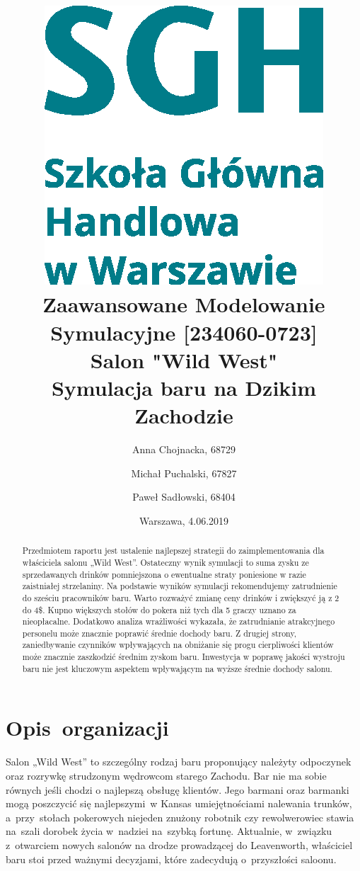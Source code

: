 \documentclass[12pt, a4paper, oneside]{mwart} %
\begin{document}
\title{\includegraphics[width = 0.3 \textwidth]{wykresy/SGHlogotypCMYKpl.eps}\\
\bigskip
Zaawansowane Modelowanie Symulacyjne [234060-0723]\\ 
\bigskip
Salon "Wild West"\\
Symulacja baru na Dzikim Zachodzie}
\author{Anna Chojnacka, 68729 \and
Michał Puchalski, 67827 \and
Paweł Sadłowski, 68404 }
\date{Warszawa, 4.06.2019}
\maketitle

\begin{abstract}
Przedmiotem raportu jest ustalenie najlepszej strategii do zaimplementowania dla właściciela salonu „Wild West”. Ostateczny wynik symulacji to suma zysku ze sprzedawanych drinków pomniejszona o ewentualne straty poniesione w razie zaistniałej strzelaniny. Na podstawie wyników symulacji rekomendujemy zatrudnienie do sześciu pracowników baru. Warto rozważyć zmianę ceny drinków i zwiększyć ją z 2 do 4\$. Kupno większych stołów do pokera niż tych dla 5 graczy uznano za nieopłacalne. Dodatkowo analiza wrażliwości wykazała, że zatrudnianie atrakcyjnego personelu może znacznie poprawić średnie dochody baru. Z drugiej strony, zaniedbywanie czynników wpływających na obniżanie się progu cierpliwości klientów może znacznie zaszkodzić średnim zyskom baru.  Inwestycja w poprawę jakości wystroju baru nie jest kluczowym aspektem wpływającym na wyższe średnie dochody salonu.
\end{abstract}

\pagebreak

\section{Opis~organizacji}
Salon „Wild West” to szczególny rodzaj baru proponujący należyty odpoczynek oraz rozrywkę strudzonym wędrowcom starego Zachodu. Bar nie ma sobie równych jeśli chodzi o najlepszą obsługę klientów. Jego barmani oraz barmanki mogą poszczycić się najlepszymi~w Kansas umiejętnościami nalewania trunków, a~przy~stołach pokerowych niejeden znużony robotnik czy rewolwerowiec stawia na~szali dorobek życia w~nadziei na~szybką fortunę. Aktualnie, w~związku z~otwarciem nowych salonów na drodze prowadzącej do Leavenworth, właściciel baru stoi przed ważnymi decyzjami, które zadecydują o~przyszłości saloonu.
\end{document}
